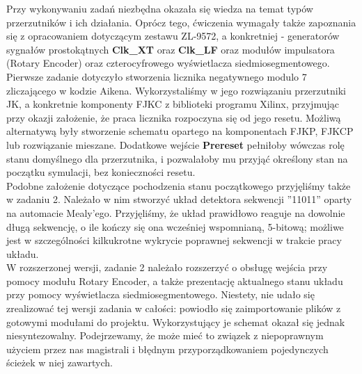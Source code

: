 \documentclass[a4paper,12pt]{extarticle}  %
\begin{document}
Przy wykonywaniu zadań niezbędna okazała się wiedza na temat typów przerzutników i ich działania. Oprócz tego, ćwiczenia wymagały także zapoznania się z opracowaniem dotyczącym zestawu ZL-9572, a konkretniej - generatorów sygnałów prostokątnych \textbf{Clk\_XT} oraz \textbf{Clk\_LF} oraz modułów impulsatora (Rotary Encoder) oraz czterocyfrowego wyświetlacza siedmiosegmentowego. \\
Pierwsze zadanie dotyczyło stworzenia licznika negatywnego modulo 7 zliczającego w kodzie Aikena. Wykorzystaliśmy w jego rozwiązaniu przerzutniki JK, a konkretnie komponenty FJKC z biblioteki programu Xilinx, przyjmując przy okazji założenie, że praca licznika rozpoczyna się od jego resetu. Możliwą alternatywą były stworzenie schematu opartego na komponentach FJKP, FJKCP lub rozwiązanie mieszane. Dodatkowe wejście \textbf{Prereset} pełniłoby wówczas rolę stanu domyślnego dla przerzutnika, i pozwalałoby mu przyjąć określony stan na początku symulacji, bez konieczności resetu. \\
Podobne założenie dotyczące pochodzenia stanu początkowego przyjęliśmy także w zadaniu 2. Należało w nim stworzyć układ detektora sekwencji ''11011'' oparty na automacie Mealy'ego. Przyjęliśmy, że układ prawidłowo reaguje na dowolnie długą sekwencję, o ile kończy się ona wcześniej wspomnianą, 5-bitową; możliwe jest w szczególności kilkukrotne wykrycie poprawnej sekwencji w trakcie pracy układu. \\
W rozszerzonej wersji, zadanie 2 należało rozszerzyć o obsługę wejścia przy pomocy modułu Rotary Encoder, a także prezentację aktualnego stanu układu przy pomocy wyświetlacza siedmiosegmentowego. Niestety, nie udało się zrealizować tej wersji zadania w całości: powiodło się zaimportowanie plików z gotowymi modułami do projektu. Wykorzystujący je schemat okazał się jednak niesyntezowalny. Podejrzewamy, że może mieć to związek z niepoprawnym użyciem przez nas magistrali i błędnym przyporządkowaniem pojedynczych ścieżek w niej zawartych. 
\end{document}
